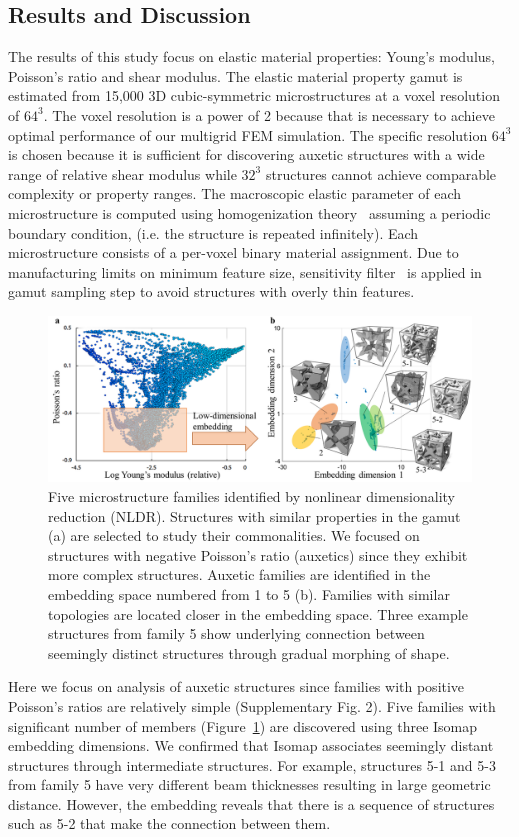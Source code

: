 \subsection{Results and Discussion}
The results of this study focus on elastic material properties: Young's modulus, Poisson's ratio and shear modulus. The elastic material property gamut is estimated from 15,000 3D cubic-symmetric microstructures at a voxel resolution of $64^3$. The voxel resolution is a power of 2 because that is necessary to achieve optimal performance of our multigrid FEM simulation. The specific resolution $64^3$ is chosen because it is sufficient for discovering auxetic structures with a wide range of relative shear modulus while $32^3$ structures cannot achieve comparable complexity or property ranges.
The macroscopic elastic parameter of each microstructure is computed using homogenization theory~\citep{Guedes1990,xia:2015:design} assuming a periodic boundary condition, (i.e. the structure is repeated infinitely).
Each microstructure consists of a per-voxel binary material assignment. Due to manufacturing limits on minimum feature size,
sensitivity filter~\citep{sigmund:2007} is applied in gamut sampling step to avoid structures with overly thin features.
\begin{figure}
\includegraphics[width=\columnwidth]{images/fiveFamilies.png}
\caption{Five microstructure families identified by nonlinear dimensionality reduction (NLDR). Structures with similar properties in the gamut (a) are selected to study their commonalities. We focused on structures with negative Poisson's ratio (auxetics) since they exhibit more complex structures. Auxetic families are identified in the embedding space numbered from 1 to 5 (b). Families with similar topologies are located closer in the embedding space. Three example structures from family 5 show underlying connection between seemingly distinct structures through gradual morphing of shape.}
\label{fig:families}
\end{figure}
Here we focus on analysis of auxetic structures since families with positive Poisson's ratios are relatively simple (Supplementary Fig. 2). Five families with significant number of members (Figure~\ref{fig:families}) are discovered using three Isomap embedding dimensions. We confirmed that Isomap associates seemingly distant structures through intermediate structures. For example, structures 5-1 and 5-3 from family 5 have very different beam thicknesses resulting in large geometric distance. However, the embedding reveals that there is a sequence of structures such as 5-2 that make the connection between them.
